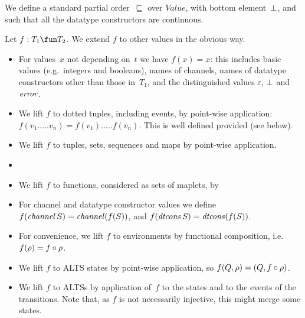 We define a standard partial order~$\sqsubseteq$ over $Value$, with bottom
element~$\perp$, and such that all the datatype constructors are continuous.

Let $f : T_1 \fun T_2$.  We extend $f$ to other
values in the obvious way.
\begin{itemize}
\item For values~$x$ not depending on~$t$ we have $f(x) = x$: this includes
  basic values (e.g.~integers and booleans), names of channels, names of
  datatype constructors other than those in~$T_1$, and the distinguished values
  $\varepsilon$, $\perp$ and $\mathord{\it error}$.

\item We lift $f$ to dotted tuples, including events, by point-wise
  application: $f(v_1.\ldots.v_n) = f(v_1).\ldots.f(v_n)$.  This is well
  defined provided  (see below).

\item We lift $f$ to tuples, sets, sequences and maps by point-wise
  application.

\item {}

\item We lift $f$ to functions, considered as sets of maplets, by

\item For channel and datatype constructor values we define
  $f(\mathop{\it channel} S) = \mathop{\it channel} (f(S))$, and
  $f(\mathop{\it dtcons} S) = \mathop{\it dtcons} (f(S))$.

\item For convenience, we lift $f$ to environments by functional
  composition, i.e.~$f(\rho) = f\circ\rho$.

\item We lift $f$ to ALTS states by point-wise application, so $f(Q,\rho) =
  (Q, f\circ\rho)$. 

\item We lift $f$ to ALTSs by application of~$f$ to the states and to the
  events of the transitions.  Note that, as $f$ is not necessarily injective,
  this might merge some states.
\end{itemize}

